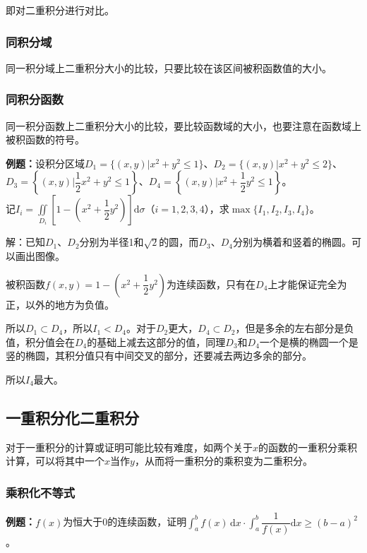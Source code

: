 \documentclass[UTF8, 12pt]{ctexart}
\begin{document}
即对二重积分进行对比。

\subsubsection{同积分域}

同一积分域上二重积分大小的比较，只要比较在该区间被积函数值的大小。

\subsubsection{同积分函数}

同一积分函数上二重积分大小的比较，要比较函数域的大小，也要注意在函数域上被积函数的符号。

\textbf{例题：}设积分区域$D_1=\{(x,y)|x^2+y^2\leqslant1\}$、$D_2=\{(x,y)|x^2+y^2\leqslant2\}$、$D_3=\left\{(x,y)|\dfrac{1}{2}x^2+y^2\leqslant1\right\}$、$D_4=\left\{(x,y)|x^2+\dfrac{1}{2}y^2\leqslant1\right\}$。\\记$I_i=\iint\limits_{D_i}\left[1-\left(x^2+\dfrac{1}{2}y^2\right)\right]\textrm{d}\sigma$（$i=1,2,3,4$），求$\max\{I_1,I_2,I_3,I_4\}$。

解：已知$D_1$、$D_2$分别为半径1和$\sqrt{2}$的圆，而$D_3$、$D_4$分别为横着和竖着的椭圆。可以画出图像。

被积函数$f(x,y)=1-\left(x^2+\dfrac{1}{2}y^2\right)$为连续函数，只有在$D_4$上才能保证完全为正，以外的地方为负值。

所以$D_1\subset D_4$，所以$I_1<D_4$。对于$D_2$更大，$D_4\subset D_2$，但是多余的左右部分是负值，积分值会在$D_4$的基础上减去这部分的值，同理$D_3$和$D_4$一个是横的椭圆一个是竖的椭圆，其积分值只有中间交叉的部分，还要减去两边多余的部分。

所以$I_4$最大。

\subsection{一重积分化二重积分}

对于一重积分的计算或证明可能比较有难度，如两个关于$x$的函数的一重积分乘积计算，可以将其中一个$x$当作$y$，从而将一重积分的乘积变为二重积分。

\subsubsection{乘积化不等式}

\textbf{例题：}$f(x)$为恒大于0的连续函数，证明$\displaystyle{\int_a^bf(x)\,\textrm{d}x\cdot\int_a^b\dfrac{1}{f(x)}\textrm{d}x\geqslant(b-a)^2}$。
\end{document}
